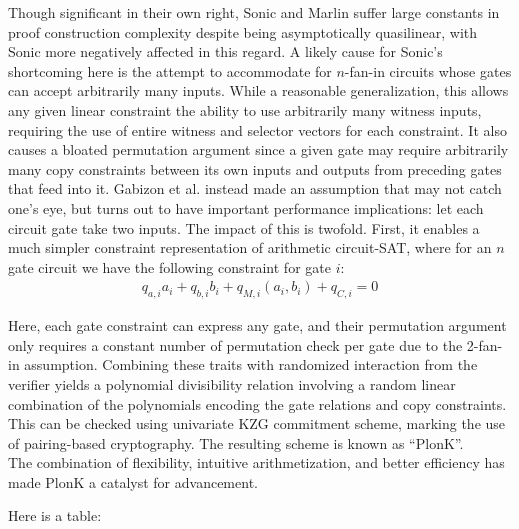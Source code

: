 \noindent Though significant in their own right, Sonic and Marlin suffer large constants in proof construction complexity despite being asymptotically quasilinear, with Sonic more negatively affected in this regard. A likely cause for Sonic's shortcoming here is the attempt to accommodate for $n$-fan-in circuits whose gates can accept arbitrarily many inputs. While a reasonable generalization, this allows any given linear constraint the ability to use arbitrarily many witness inputs, requiring the use of entire witness and selector vectors for each constraint. It also causes a bloated permutation argument since a given gate may require arbitrarily many copy constraints between its own inputs and outputs from preceding gates that feed into it. Gabizon et al. \cite{plonk} instead made an assumption that may not catch one's eye, but turns out to have important performance implications: let each circuit gate take two inputs. The impact of this is twofold. First, it enables a much simpler constraint representation of arithmetic circuit-SAT, where for an $n$ gate circuit we have the following constraint for gate $i$:
\begin{align}
    q_{a, i} a_i + q_{b, i} b_i + q_{M, i} (a_i, b_i) + q_{C, i} = 0
\end{align}

Here, each gate constraint can express any gate, and their permutation argument only requires a constant number of permutation check per gate due to the 2-fan-in assumption. Combining these traits with randomized interaction from the verifier yields a polynomial divisibility relation involving a random linear combination of the polynomials encoding the gate relations and copy constraints. This can be checked using univariate KZG commitment scheme, marking the use of pairing-based cryptography. The resulting scheme is known as ``PlonK''.\\

\noindent The combination of flexibility, intuitive arithmetization, and better efficiency has made PlonK a catalyst for advancement.

\noindent Here is a table:

